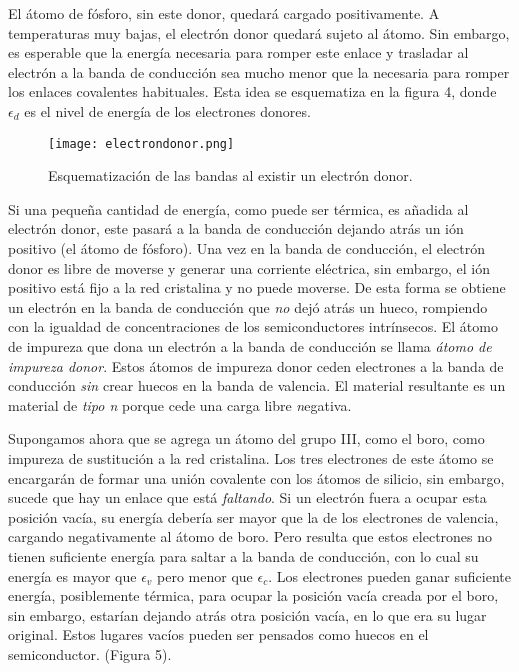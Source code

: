 \documentclass[12pt,a4paper]{article}
\begin{document}
El átomo de fósforo, sin este donor, quedará cargado positivamente. A temperaturas muy bajas, el electrón donor quedará sujeto al átomo. Sin embargo, es esperable que la energía necesaria para romper este enlace y trasladar al electrón a la banda de conducción sea mucho menor que la necesaria para romper los enlaces covalentes habituales. Esta idea se esquematiza en la figura 4, donde $\epsilon _{d}$ es el nivel de energía de los electrones donores.

\begin{figure}[ht!]
\begin{center}
\texttt{[image: electrondonor.png]}
\caption{Esquematización de las bandas al existir un electrón donor.}
\end{center}
\end{figure}

Si una pequeña cantidad de energía, como puede ser térmica, es añadida al electrón donor, este pasará a la banda de conducción dejando atrás un ión positivo (el átomo de fósforo). Una vez en la banda de conducción, el electrón donor es libre de moverse y generar una corriente eléctrica, sin embargo, el ión positivo está fijo a la red cristalina y no puede moverse. De esta forma se obtiene un electrón en la banda de conducción que \emph{no} dejó atrás un hueco, rompiendo con la igualdad de concentraciones de los semiconductores intrínsecos. El átomo de impureza que dona un electrón a la banda de conducción se llama \emph{átomo de impureza donor}. Estos átomos de impureza donor ceden electrones a la banda de conducción \emph{sin} crear huecos en la banda de valencia. El material resultante es un material de \emph{tipo n} porque cede una carga libre \emph{n}egativa.

Supongamos ahora que se agrega un átomo del grupo III, como el boro, como impureza de sustitución a la red cristalina. Los tres electrones de este átomo se encargarán de formar una unión covalente con los átomos de silicio, sin embargo, sucede que hay un enlace que está \emph{faltando}. Si un electrón fuera a ocupar esta posición vacía, su energía debería ser mayor que la de los electrones de valencia, cargando negativamente al átomo de boro. Pero resulta que estos electrones no tienen suficiente energía para saltar a la banda de conducción, con lo cual su energía es mayor que $\epsilon _{v}$ pero menor que $\epsilon _{c}$. Los electrones pueden ganar suficiente energía, posiblemente térmica, para ocupar la posición vacía creada por el boro, sin embargo, estarían dejando atrás otra posición vacía, en lo que era su lugar original. Estos lugares vacíos pueden ser pensados como huecos en el semiconductor. (Figura 5).
\end{document}
